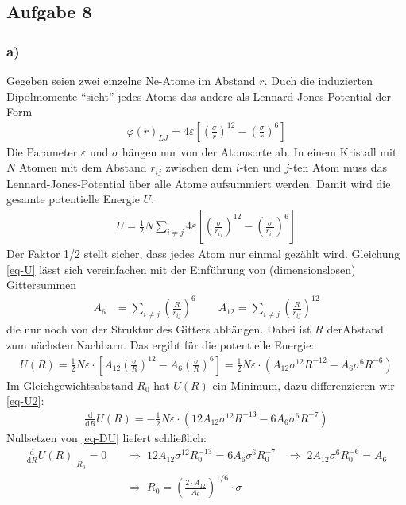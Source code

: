 \documentclass[11pt]{article}
\begin{document}
\subsection*{Aufgabe 8}
\subsubsection*{a)}
Gegeben seien zwei einzelne Ne-Atome im Abstand $r$. Duch die induzierten
Dipolmomente "`sieht"' jedes Atoms das andere als Lennard-Jones-Potential der Form
\begin{align}
  \varphi(r)_{LJ} = 4 \varepsilon \left[ \left(\frac{\sigma}{r}\right)^{12} -
    \left(\frac{\sigma}{r}\right)^{6} \right]
\end{align}
Die Parameter $\varepsilon$ und $\sigma$ hängen nur von der Atomsorte ab.
In einem Kristall mit $N$ Atomen mit dem Abstand $r_{ij}$ zwischen dem
$i$-ten und $j$-ten Atom muss das Lennard-Jones-Potential über alle Atome
aufsummiert werden. Damit wird die gesamte potentielle Energie $U$:
\begin{align}
\label{eq-U}
  U = \frac{1}{2} N \sum_{i \ne j} 4 \varepsilon
  \left[ \left(\frac{\sigma}{r_{ij}}\right)^{12} -
  \left(\frac{\sigma}{r_{ij}}\right)^{6} \right]
\end{align}
Der Faktor 1/2 stellt sicher, dass jedes Atom nur einmal gezählt wird.
Gleichung \eqref{eq-U} lässt sich vereinfachen mit der Einführung von
(dimensionslosen) Gittersummen
\begin{align*}
  A_6 & = \left . \sum_{i \ne j} \left(\frac{R}{r_{ij}}\right)^6 \right .\qquad
  A_{12} = \sum_{i \ne j} \left(\frac{R}{r_{ij}}\right)^{12}
\end{align*}
die nur noch von der Struktur des Gitters abhängen.  Dabei ist $R$ derAbstand
zum nächsten Nachbarn. Das ergibt für die potentielle Energie:
\begin{align}
\label{eq-U2}
  U(R) = \frac{1}{2} N \varepsilon \cdot \left[ A_{12} \left(\frac{\sigma}{R}\right)^{12} -
  A_6 \left(\frac{\sigma}{R}\right)^{6} \right] =
  \frac{1}{2} N \varepsilon \cdot \left( A_{12} \sigma^{12} R^{-12} -
  A_6 \sigma^6 R^{-6} \right)
\end{align}
Im Gleichgewichtsabstand $R_0$ hat $U(R)$ ein Minimum, dazu differenzieren
wir \eqref{eq-U2}:
\begin{align}
\label{eq-DU}
  \frac{\mathrm{d}}{\mathrm{d} R} U(R) = - \frac{1}{2} N \varepsilon \cdot
    \left(12 A_{12} \sigma^{12} R^{-13} - 6 A_6 \sigma^6 R^{-7} \right)
\end{align}
Nullsetzen von \eqref{eq-DU} liefert schließlich:
\begin{align}
  \nonumber
  \left. \frac{\mathrm{d}}{\mathrm{d} R} U(R) \right|_{R_0} = 0 \quad& \Rightarrow\;
  12 A_{12} \sigma^{12} R_0^{-13} = 6 A_6 \sigma^6 R_0^{-7} \quad \Rightarrow\;
  2 A_{12} \sigma^6 R_0^{-6} = A_6 \\
  \label{eq-R0}
  \;& \Rightarrow\; R_0 = \left(\frac{2 \cdot A_{12}}{A_6}\right)^{1/6} \cdot \sigma
\end{align}
\end{document}
